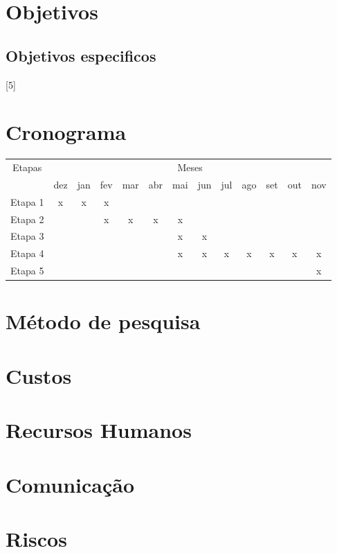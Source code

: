 \documentclass[12pt]{article}
\begin{document}
    \blindtext\cite{Hastad1987}

    \blindtext\cite{Sipser2006}

\section{Objetivos}

    \blindtext[1]

\subsection{Objetivos especificos} %

    [5]

\section{Cronograma}

    \begin{tabular}{|c|c|c|c|c|c|c|c|c|c|c|c|c|}
        \hline
        \multirow{2}{*}{Etapas} & \multicolumn{12}{|c|}{Meses}\\ \cline{2-13}
                & dez & jan & fev & mar & abr & mai & jun & jul & ago & set & out & nov \\ \hline
        Etapa 1 &  x  &  x  &  x  &     &     &     &     &     &     &     &     &     \\ \hline
        Etapa 2 &     &     &  x  &  x  &  x  &  x  &     &     &     &     &     &     \\ \hline
        Etapa 3 &     &     &     &     &     &  x  &  x  &     &     &     &     &     \\ \hline
        Etapa 4 &     &     &     &     &     &  x  &  x  &  x  &  x  &  x  &  x  &  x  \\ \hline
        Etapa 5 &     &     &     &     &     &     &     &     &     &     &     &  x  \\ \hline
    \end{tabular}

\section{Método de pesquisa}
    \blindtext[3]

\section{Custos}
    \blindtext[1]

\section{Recursos Humanos}
    \blindtext[1]

\section{Comunicação}
    \blindtext[1]

\section{Riscos}
    \blindtext[1]



\end{document}
